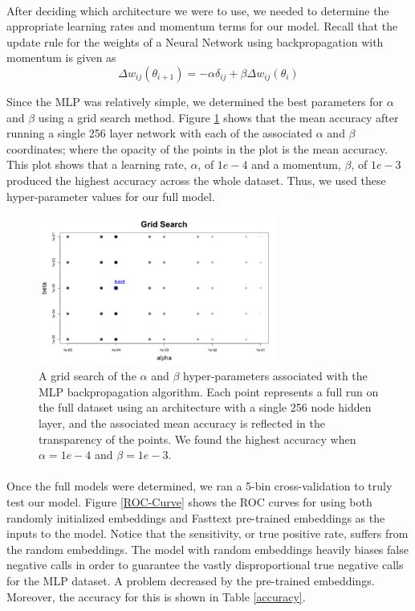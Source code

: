\documentclass[11.5pt]{article}
\newcounter{Figure}
\newcounter{graphics}
\begin{document}
\paragraph{} After deciding which architecture we were to use, we needed to determine the appropriate learning rates and momentum terms for our model. Recall that the update rule for the weights of a Neural Network using backpropagation with momentum is given as 
$$ \Delta w_{ij} (\theta_{i+1}) = -\alpha \delta_{ij}  + \beta \Delta w_{ij} (\theta_i)$$

Since the MLP was relatively simple, we determined the best parameters for $\alpha$ and $\beta$ using a grid search method. Figure \ref{GridSearch} shows that the mean accuracy after running a single 256 layer network with each of the associated $\alpha$ and $\beta$ coordinates; where the opacity of the points in the plot is the mean accuracy. This plot shows that a learning rate, $\alpha$, of $1e-4$ and a momentum, $\beta$, of $1e-3$ produced the highest accuracy across the whole dataset. Thus, we used these hyper-parameter values for our full model. 


 \begin{figure}[h!]
\centerline{\includegraphics[width=0.7\textwidth]{report_mlp/GridSearch.png}}
  \caption{\small A grid search of the $\alpha$ and $\beta$ hyper-parameters associated with the MLP backpropagation algorithm. Each point represents a full run on the full dataset using an architecture with a single 256 node hidden layer, and the associated mean accuracy is reflected in the transparency of the points. We found the highest accuracy when $\alpha = 1e-4$ and $\beta =1e-3$. }
\label{GridSearch}
\end{figure}

 
 \paragraph{} Once the full models were determined, we ran a 5-bin cross-validation to truly test our model. Figure \ref{ROC-Curve} shows the ROC curves for using both randomly initialized embeddings and Fasttext pre-trained embeddings as the inputs to the model. Notice that the sensitivity, or true positive rate, suffers from the random embeddings. The model with random embeddings heavily biases false negative calls in order to guarantee the vastly disproportional true negative calls for the MLP dataset. A problem decreased by the pre-trained embeddings. Moreover, the accuracy for this is shown in Table \ref{accuracy}.  
 
\end{document}
